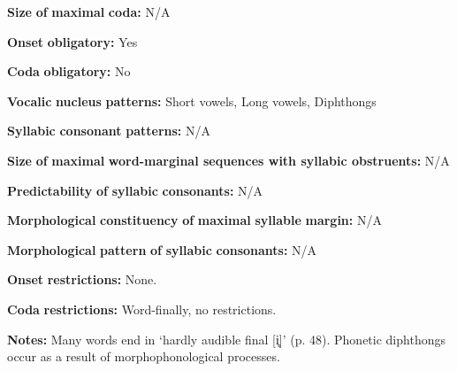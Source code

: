 \begin{styleBody}
\textbf{Size} \textbf{of} \textbf{maximal} \textbf{coda:} N/A
\end{styleBody}

\begin{styleBody}
\textbf{Onset} \textbf{obligatory:} Yes
\end{styleBody}

\begin{styleBody}
\textbf{Coda} \textbf{obligatory:} No
\end{styleBody}

\begin{styleBody}
\textbf{Vocalic} \textbf{nucleus} \textbf{patterns:} Short vowels, Long vowels, Diphthongs
\end{styleBody}

\begin{styleBody}
\textbf{Syllabic} \textbf{consonant} \textbf{patterns:} N/A
\end{styleBody}

\begin{styleBody}
\textbf{Size} \textbf{of} \textbf{maximal} \textbf{word{}-marginal sequences with syllabic obstruents:} N/A
\end{styleBody}

\begin{styleBody}
\textbf{Predictability} \textbf{of} \textbf{syllabic} \textbf{consonants:} N/A
\end{styleBody}

\begin{styleBody}
\textbf{Morphological} \textbf{constituency} \textbf{of} \textbf{maximal} \textbf{syllable} \textbf{margin:} N/A
\end{styleBody}

\begin{styleBody}
\textbf{Morphological} \textbf{pattern} \textbf{of} \textbf{syllabic} \textbf{consonants:} N/A
\end{styleBody}

\begin{styleBody}
\textbf{Onset} \textbf{restrictions:} None.
\end{styleBody}

\begin{styleBody}
\textbf{Coda} \textbf{restrictions:} Word-finally, no restrictions.
\end{styleBody}

\begin{styleBody}
\textbf{Notes:} Many words end in ‘hardly audible final [i̥]’ (p. 48). Phonetic diphthongs occur as a result of morphophonological processes.
\end{styleBody}

